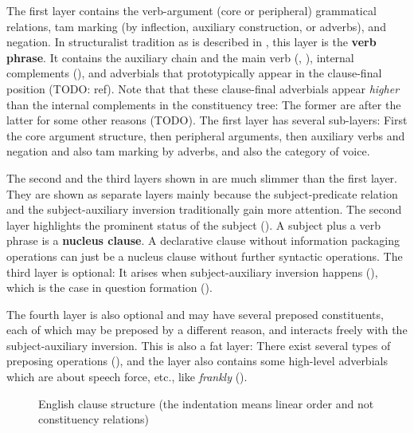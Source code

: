 \documentclass[UTF8, a4paper, oneside, scheme=plain]{ctexrep}
\newcommand*{\concept}[1]{\textbf{#1}}
\newcommand{\corpus}[1]{\emph{#1}}
\begin{document}
The first layer contains the verb-argument (core or peripheral) grammatical relations,
\ac{tam} marking (by inflection, auxiliary construction, or adverbs), and negation.
In structuralist tradition as is described in \citet{cgel},
this layer is the \concept{verb phrase}.
It contains the auxiliary chain and the main verb 
(, ),
internal complements (),
and adverbials that prototypically appear in the clause-final position (TODO: ref).
Note that that these clause-final adverbials 
appear \emph{higher} than the internal complements 
in the constituency tree:
The former are after the latter for some other reasons (TODO).
The first layer has several sub-layers:
First the core argument structure,
then peripheral arguments, 
then auxiliary verbs and negation and also \acs{tam} marking by adverbs,
and also the category of voice. 

The second and the third layers shown in 
are much slimmer than the first layer.
They are shown as separate layers mainly because 
the subject-predicate relation 
and the subject-auxiliary inversion 
traditionally gain more attention.
The second layer highlights the prominent status of the subject ().
A subject plus a verb phrase is a \concept{nucleus clause}.
A declarative clause without information packaging operations
can just be a nucleus clause without further syntactic operations.
The third layer is optional:
It arises when subject-auxiliary inversion happens (),
which is the case in %
question formation ().

The fourth layer is also optional and may have several preposed constituents,
each of which may be preposed by a different reason,
and interacts freely with the subject-auxiliary inversion.
This is also a fat layer:
There exist several types of preposing operations (),
and the layer also contains some high-level adverbials
which are about speech force, etc., %
like \corpus{frankly} ().

\begin{figure}[H]
    \centering
    
    \caption{English clause structure (the indentation means linear order and not constituency relations)}
    \label{fig:clause-template}
\end{figure}
\end{document}
